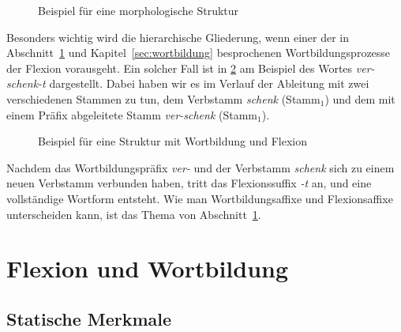 \begin{figure}
  \centering
  \caption{Beispiel für eine morphologische Struktur}
  \label{fig:flextree}
\end{figure}

Besonders wichtig wird die hierarchische Gliederung, wenn einer der in Abschnitt~\ref{sec:flexwortbild} und Kapitel~\ref{sec:wortbildung} besprochenen Wortbildungsprozesse der Flexion vorausgeht.
Ein solcher Fall ist in \ref{fig:flexwbtree} am Beispiel des Wortes \textit{ver-schenk-t} dargestellt.
Dabei haben wir es im Verlauf der Ableitung mit zwei verschiedenen Stammen zu tun, dem Verbstamm \textit{schenk} (Stamm$_{\text{1}}$) und dem mit einem Präfix abgeleitete Stamm \textit{ver-schenk} (Stamm$_{\text{1}}$).

\begin{figure}
  \centering
  \caption{Beispiel für eine Struktur mit Wortbildung und Flexion}
  \label{fig:flexwbtree}
\end{figure}

Nachdem das Wortbildungspräfix \textit{ver-} und der Verbstamm \textit{schenk} sich zu einem neuen Verbstamm verbunden haben, tritt das Flexionssuffix \textit{-t} an, und eine vollständige Wortform entsteht.
Wie man Wortbildungsaffixe und Flexionsaffixe unterscheiden kann, ist das Thema von Abschnitt~\ref{sec:flexwortbild}.

\section{Flexion und Wortbildung}

\label{sec:flexwortbild}

\subsection{Statische Merkmale}

